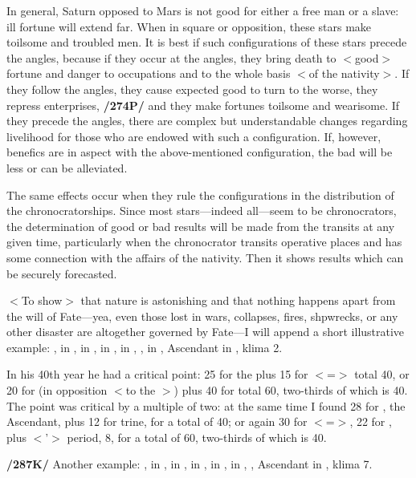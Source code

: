 In general, Saturn opposed to Mars is not good for either a free man or a slave: ill fortune will extend far. When in square or opposition, these stars make toilsome and troubled men. It is best if such
configurations of these stars precede the angles, because if they occur at the angles, they bring death to $<$good$>$ fortune and danger to occupations and to the whole basis $<$of the nativity$>$. If they follow the angles, they cause expected good to turn to the worse, they repress enterprises, \textbf{/274P/} and they make fortunes toilsome and wearisome. If they precede the angles, there are complex but understandable changes regarding livelihood for those who are endowed with such a configuration. If, however, benefics are in
aspect with the above-mentioned configuration, the bad will be less or can be alleviated.

The same effects occur when they rule the configurations in the distribution of the chronocratorships. Since most stars—indeed all—seem to be chronocrators, the determination of good or bad results will be made from the transits at any given time, particularly when the chronocrator transits operative places and has some connection with the affairs of the nativity. Then it shows results which can be securely
forecasted.

$<$To show$>$ that nature is astonishing and that nothing happens apart from the will of Fate—yea, even those lost in wars, collapses, fires, shpwrecks, or any other disaster are altogether governed by Fate—I will append a short illustrative example: \Sun, \Mercury\xspace in \Leo, \Moon\xspace in \Libra, \Saturn\xspace in \Aries, \Jupiter\xspace in \Taurus, \Mars, \Venus\xspace in \Virgo, Ascendant in \Capricorn, klima 2. 

In his 40th year he had a critical point: 25 for the \Moon\xspace plus 15 for \Aries\xspace $<$=\Mars$>$ total 40, or 20 for \Aries\xspace (in opposition $<$to the \Moon$>$) plus 40 for \Libra\xspace total 60, two-thirds of which is 40. The point was critical by a multiple of two: at the same time I found 28 for \Capricorn, the Ascendant, plus 12 for \Jupiter trine, for a total of 40; or again 30 for \Capricorn\xspace $<$=\Saturn$>$, 22 for \Taurus, plus $<$\Venus’$>$ period, 8, for a total of 60, two-thirds of which is 40.

\textbf{/287K/} Another example: \Sun, \Mercury\xspace in \Aquarius, \Moon\xspace in \Scorpio, \Saturn\xspace in \Cancer, \Jupiter\xspace in \Libra, \Venus\xspace in \Capricorn, \Mars, Ascendant in \Virgo, klima 7. 

